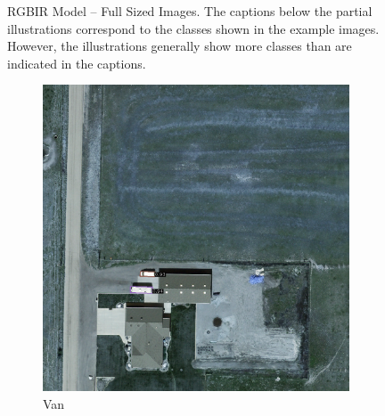 \begin{figure}[h!]
    \caption[RGBIR Model – Full Sized Images]{RGBIR Model – Full Sized Images. The captions below the partial illustrations correspond to the classes shown in the example images. However, the illustrations generally show more classes than are indicated in the captions.}
    \label{fig:rgbir_perm_exp_examples_fs}
\end{figure}

\begin{figure}[h!]
    \centering
    \begin{subfigure}[t]{0.38\textwidth}
        \centering
        \includegraphics[width=\linewidth]{images/015Results/02perm_exp/comp_images/rgb/198.png}
        \caption{Van}
    \end{subfigure}
    \begin{subfigure}[t]{0.38\textwidth}
        \centering

\end{subfigure}
\end{figure}
